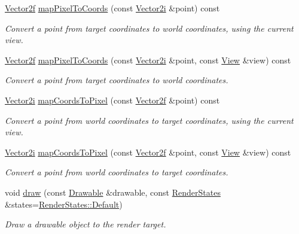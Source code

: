 \begin{DoxyCompactItemize}
\hyperlink{classsf_1_1_vector2}{Vector2f} \hyperlink{classsf_1_1_render_target_a0103ebebafa43a97e6e6414f8560d5e3}{map\+Pixel\+To\+Coords} (const \hyperlink{classsf_1_1_vector2}{Vector2i} \&point) const
\begin{DoxyCompactList}\small\item\em Convert a point from target coordinates to world coordinates, using the current view. \end{DoxyCompactList}\item 
\hyperlink{classsf_1_1_vector2}{Vector2f} \hyperlink{classsf_1_1_render_target_a2d3e9d7c4a1f5ea7e52b06f53e3011f9}{map\+Pixel\+To\+Coords} (const \hyperlink{classsf_1_1_vector2}{Vector2i} \&point, const \hyperlink{classsf_1_1_view}{View} \&view) const
\begin{DoxyCompactList}\small\item\em Convert a point from target coordinates to world coordinates. \end{DoxyCompactList}\item 
\hyperlink{classsf_1_1_vector2}{Vector2i} \hyperlink{classsf_1_1_render_target_ad92a9f0283aa5f3f67e473c1105b68cf}{map\+Coords\+To\+Pixel} (const \hyperlink{classsf_1_1_vector2}{Vector2f} \&point) const
\begin{DoxyCompactList}\small\item\em Convert a point from world coordinates to target coordinates, using the current view. \end{DoxyCompactList}\item 
\hyperlink{classsf_1_1_vector2}{Vector2i} \hyperlink{classsf_1_1_render_target_a848eee44b72ac3f16fa9182df26e83bc}{map\+Coords\+To\+Pixel} (const \hyperlink{classsf_1_1_vector2}{Vector2f} \&point, const \hyperlink{classsf_1_1_view}{View} \&view) const
\begin{DoxyCompactList}\small\item\em Convert a point from world coordinates to target coordinates. \end{DoxyCompactList}\item 
void \hyperlink{classsf_1_1_render_target_a12417a3bcc245c41d957b29583556f39}{draw} (const \hyperlink{classsf_1_1_drawable}{Drawable} \&drawable, const \hyperlink{classsf_1_1_render_states}{Render\+States} \&states=\hyperlink{classsf_1_1_render_states_ad29672df29f19ce50c3021d95f2bb062}{Render\+States\+::\+Default})
\begin{DoxyCompactList}\small\item\em Draw a drawable object to the render target. \end{DoxyCompactList}\item 

\end{DoxyCompactItemize}
